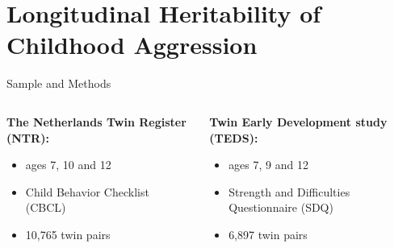 \documentclass{beamer}
\begin{document}
\section{Longitudinal Heritability of Childhood Aggression}

\begin{frame}[t]{Sample and Methods}
  \begin{columns}
    \begin{column}{0.5\textwidth}
      \textbf{The Netherlands Twin Register (NTR):}\\
      \begin{itemize}
        \item ages 7, 10 and 12
        \item Child Behavior Checklist (CBCL)
        \item 10,765 twin pairs
      \end{itemize}
    \end{column}
    \begin{column}{0.5\textwidth}
      \textbf{Twin Early Development study (TEDS):}\\
      \begin{itemize}
        \item ages 7, 9 and 12
        \item Strength and Difficulties Questionnaire (SDQ)
        \item 6,897 twin pairs
      \end{itemize}
    \end{column}
  \end{columns}
  \begin{center}
    \scalebox{0.5}{}
  \end{center}
\end{frame}
\end{document}
